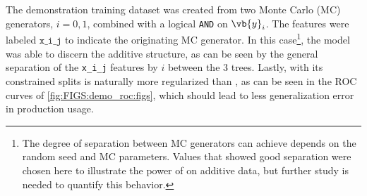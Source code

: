 The demonstration training dataset was created from two Monte Carlo (MC) generators, $i=0,1$,
combined with a logical \texttt{AND} on $\vb{y}_{i}$.
The features were labeled $\texttt{x\_i\_j}$ to indicate the originating MC generator.
In this case\footnote{The degree of separation between MC generators
\figs can achieve depends on the random seed and MC parameters.
Values that showed good separation were chosen here to illustrate
the power of \figs on additive data,
but further study is needed to quantify this behavior.},
the \figs model was able to discern the additive structure,
as can be seen by the general separation of the \texttt{x\_i\_j} features by $i$ between the \num{3} trees.
Lastly, with its constrained splits \figs is naturally more regularized than \xgboost,
as can be seen in the ROC curves of \cref{fig:FIGS:demo_roc:figs},
which should lead to less generalization error in production usage.

\newpage

